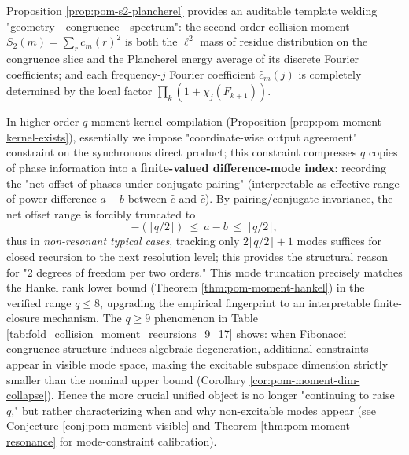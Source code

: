 \begin{remark}\label{rem:pom-closure-dim-mode-trunc}
Proposition \ref{prop:pom-s2-plancherel} provides an auditable template welding "geometry—congruence—spectrum": the second-order collision moment
\(
S_2(m)=\sum_r c_m(r)^2
\)
is both the \(\ell^2\) mass of residue distribution on the congruence slice and the Plancherel energy average of its discrete Fourier coefficients; and each frequency-\(j\) Fourier coefficient \(\widehat c_m(j)\) is completely determined by the local factor \(\prod_k(1+\chi_j(F_{k+1}))\).

In higher-order \(q\) moment-kernel compilation (Proposition \ref{prop:pom-moment-kernel-exists}), essentially we impose "coordinate-wise output agreement" constraint on the synchronous direct product; this constraint compresses \(q\) copies of phase information into a \textbf{finite-valued difference-mode index}: recording the "net offset of phases under conjugate pairing" (interpretable as effective range of power difference \(a-b\) between \(\widehat c\) and \(\overline{\widehat c}\)). By pairing/conjugate invariance, the net offset range is forcibly truncated to
\[
-(\lfloor q/2\rfloor)\ \le\ a-b\ \le\ \lfloor q/2\rfloor,
\]
thus in \emph{non-resonant typical cases}, tracking only \(2\lfloor q/2\rfloor+1\) modes suffices for closed recursion to the next resolution level; this provides the structural reason for "2 degrees of freedom per two orders." This mode truncation precisely matches the Hankel rank lower bound (Theorem \ref{thm:pom-moment-hankel}) in the verified range \(q\le 8\), upgrading the empirical fingerprint to an interpretable finite-closure mechanism.
The \(q\ge 9\) phenomenon in Table \ref{tab:fold_collision_moment_recursions_9_17} shows: when Fibonacci congruence structure induces algebraic degeneration, additional constraints appear in visible mode space, making the excitable subspace dimension strictly smaller than the nominal upper bound (Corollary \ref{cor:pom-moment-dim-collapse}). Hence the more crucial unified object is no longer "continuing to raise \(q\)," but rather characterizing when and why non-excitable modes appear (see Conjecture \ref{conj:pom-moment-visible} and Theorem \ref{thm:pom-moment-resonance} for mode-constraint calibration).
\end{remark}



